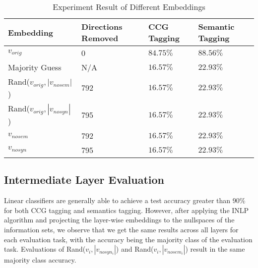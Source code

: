 \documentclass[11pt,a4paper]{article}
\begin{document}
\begin{table*}[h]
    \centering
    \begin{tabular}{llll}
    \hline
    \textbf{Embedding} & \textbf{Directions Removed} & \textbf{CCG Tagging} &\textbf{Semantic Tagging} \\
    \hline
    $v_{orig}$ & 0 & $84.75\%$ & $88.56\%$ \\
    \hline
    Majority Guess & N/A&$16.57\%$  &$22.93\%$ \\ \hline
    Rand($v_{orig}, |v_{nosem}|$) & 792 & $16.57\%$ & $22.93\%$ \\
    Rand($v_{orig}, |v_{nosyn}|$) & 795 & $16.57\%$ & $22.93\%$ \\
    \hline
    $v_{nosem}$ & 792 & $16.57\%$ & $22.93\%$ \\
    $v_{nosyn}$ & 795 & $16.57\%$ & $22.93\%$ \\
    \hline
    \hline
    \end{tabular}
    \caption{\label{role description} Experiment Result of Different Embeddings
    }
    \end{table*}

\subsection{Intermediate Layer Evaluation}

Linear classifiers are generally able to achieve a test accuracy greater than 90\% for both CCG tagging and semantics tagging. However, after applying the INLP algorithm and projecting the layer-wise embeddings to the nullspaces of the information sets, we observe that we get the same results across all layers for each evaluation task, with the accuracy being the majority class of the evaluation task. Evaluations of Rand($v_i, |v_{nosyn_i}|$) and Rand($v_i, |v_{nosem_i}|$) result in the same majority class accuracy.
\end{document}
